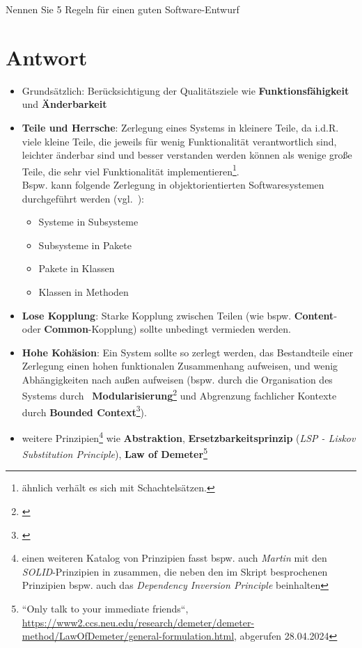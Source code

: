 Nennen Sie 5 Regeln für einen guten Software-Entwurf

\section*{Antwort}

\begin{itemize}
    \item Grundsätzlich: Berücksichtigung der Qualitätsziele wie \textbf{Funktionsfähigkeit} und \textbf{Änderbarkeit}
    \item \textbf{Teile und Herrsche}: Zerlegung eines Systems in kleinere Teile, da i.d.R. viele kleine Teile, die jeweils für wenig Funktionalität verantwortlich sind, leichter änderbar sind und besser verstanden werden können als wenige große Teile, die sehr viel Funktionalität implementieren\footnote{
    ähnlich verhält es sich mit Schachtelsätzen.
    }.\\
    Bspw. kann folgende Zerlegung in objektorientierten Softwaresystemen durchgeführt werden (vgl.~\cite[70]{Wed09b}):
        \begin{itemize}
            \item Systeme in Subsysteme
            \item Subsysteme in Pakete
            \item Pakete in Klassen
            \item Klassen in Methoden
        \end{itemize}
    \item \textbf{Lose Kopplung}: Starke Kopplung zwischen Teilen (wie bspw. \textbf{Content}- oder \textbf{Common}-Kopplung) sollte unbedingt vermieden werden.
    \item \textbf{Hohe Kohäsion}: Ein System sollte so zerlegt werden, das Bestandteile einer Zerlegung einen hohen funktionalen Zusammenhang aufweisen, und wenig Abhängigkeiten nach außen aufweisen (bspw. durch die Organisation des Systems durch ~\textbf{Modularisierung}\footnote{
    \cite{Par72}
    } und Abgrenzung fachlicher Kontexte durch \textbf{Bounded Context}\footnote{\cite[335 ff.]{Eva03}}).
    \item weitere Prinzipien\footnote{
    einen weiteren Katalog von Prinzipien fasst bspw. auch \textit{Martin} mit den \textit{SOLID}-Prinzipien in \cite{Mar03} zusammen, die neben den im Skript besprochenen Prinzipien bspw. auch das \textit{Dependency Inversion Principle} beinhalten
    } wie \textbf{Abstraktion}, \textbf{Ersetzbarkeitsprinzip} (\textit{LSP - Liskov Substitution Principle}), \textbf{Law of Demeter}\footnote{
        ``Only talk to your immediate friends``, \url{https://www2.ccs.neu.edu/research/demeter/demeter-method/LawOfDemeter/general-formulation.html}, abgerufen 28.04.2024
    }
\end{itemize}